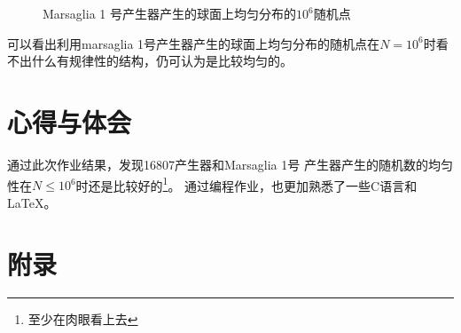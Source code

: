 \documentclass[a4paper,11pt]{article}
\begin{document}
\begin{figure}[!htbp]   
\centering     
{}
\caption{Marsaglia 1 号产生器产生的球面上均匀分布的$10^{6}$随机点}      
\end{figure}

\clearpage
可以看出利用marsaglia 1号产生器产生的球面上均匀分布的随机点在$N=10^{6}$时看不出什么有规律性的结构，仍可认为是比较均匀的。


\section{心得与体会}
通过此次作业结果，发现16807产生器和Marsaglia 1号 产生器产生的随机数的均匀性在$N \leq 10^{6}$时还是比较好的\footnote{至少在肉眼看上去}。
通过编程作业，也更加熟悉了一些C语言和\LaTeX 。

\newpage
\section{附录}
\end{document}
